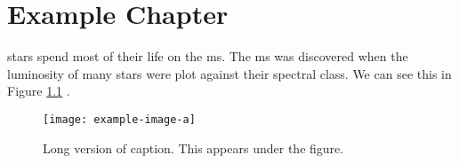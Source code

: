 \chapter{Example Chapter}

\Glspl{star} spend most of their life on the \acrfull{ms}. The \acrshort{ms} was discovered when the \gls{luminosity} of many stars were plot against their spectral class. We can see this in Figure \ref{fig:example} \citep{einstein}.


\begin{figure}[ht]
  \centering
  \texttt{[image: example-image-a]}
  \caption[Short version of caption]{Long version of caption. This appears under the figure.}
  \label{fig:example}
\end{figure}
